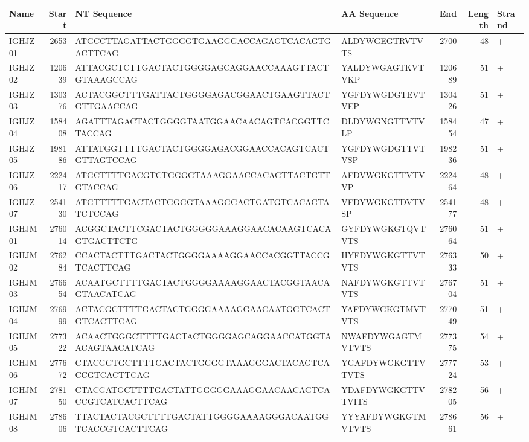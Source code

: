 \begin{tabular}{lrllrrl}
  \toprule Name & Start & NT Sequence & AA Sequence & End & Length & Strand \\ 
  \midrule IGHJZ01 & 2653 & ATGCCTTAGATTACTGGGGTGAAGGGACCAGAGTCACAGTGACTTCAG & ALDYWGEGTRVTVTS & 2700 & 48 & + \\ 
  IGHJZ02 & 120639 & ATTACGCTCTTGACTACTGGGGAGCAGGAACCAAAGTTACTGTAAAGCCAG & YALDYWGAGTKVTVKP & 120689 & 51 & + \\ 
  IGHJZ03 & 130376 & ACTACGGCTTTGATTACTGGGGAGACGGAACTGAAGTTACTGTTGAACCAG & YGFDYWGDGTEVTVEP & 130426 & 51 & + \\ 
  IGHJZ04 & 158408 & AGATTTAGACTACTGGGGTAATGGAACAACAGTCACGGTTCTACCAG & DLDYWGNGTTVTVLP & 158454 & 47 & + \\ 
  IGHJZ05 & 198186 & ATTATGGTTTTGACTACTGGGGAGACGGAACCACAGTCACTGTTAGTCCAG & YGFDYWGDGTTVTVSP & 198236 & 51 & + \\ 
  IGHJZ06 & 222417 & ATGCTTTTGACGTCTGGGGTAAAGGAACCACAGTTACTGTTGTACCAG & AFDVWGKGTTVTVVP & 222464 & 48 & + \\ 
  IGHJZ07 & 254130 & ATGTTTTTGACTACTGGGGTAAAGGGACTGATGTCACAGTATCTCCAG & VFDYWGKGTDVTVSP & 254177 & 48 & + \\ 
  IGHJM01 & 276014 & ACGGCTACTTCGACTACTGGGGGAAAGGAACACAAGTCACAGTGACTTCTG & GYFDYWGKGTQVTVTS & 276064 & 51 & + \\ 
  IGHJM02 & 276284 & CCACTACTTTGACTACTGGGGAAAAGGAACCACGGTTACCGTCACTTCAG & HYFDYWGKGTTVTVTS & 276333 & 50 & + \\ 
  IGHJM03 & 276654 & ACAATGCTTTTGACTACTGGGGAAAAGGAACTACGGTAACAGTAACATCAG & NAFDYWGKGTTVTVTS & 276704 & 51 & + \\ 
  IGHJM04 & 276999 & ACTACGCTTTTGACTACTGGGGAAAAGGAACAATGGTCACTGTCACTTCAG & YAFDYWGKGTMVTVTS & 277049 & 51 & + \\ 
  IGHJM05 & 277322 & ACAACTGGGCTTTTGACTACTGGGGAGCAGGAACCATGGTAACAGTAACATCAG & NWAFDYWGAGTMVTVTS & 277375 & 54 & + \\ 
  IGHJM06 & 277672 & CTACGGTGCTTTTGACTACTGGGGTAAAGGGACTACAGTCACCGTCACTTCAG & YGAFDYWGKGTTVTVTS & 277724 & 53 & + \\ 
  IGHJM07 & 278150 & CTACGATGCTTTTGACTATTGGGGGAAAGGAACAACAGTCACCGTCATCACTTCAG & YDAFDYWGKGTTVTVITS & 278205 & 56 & + \\ 
  IGHJM08 & 278606 & TTACTACTACGCTTTTGACTATTGGGGAAAAGGGACAATGGTCACCGTCACTTCAG & YYYAFDYWGKGTMVTVTS & 278661 & 56 & + \\ 
   \bottomrule \end{tabular}

